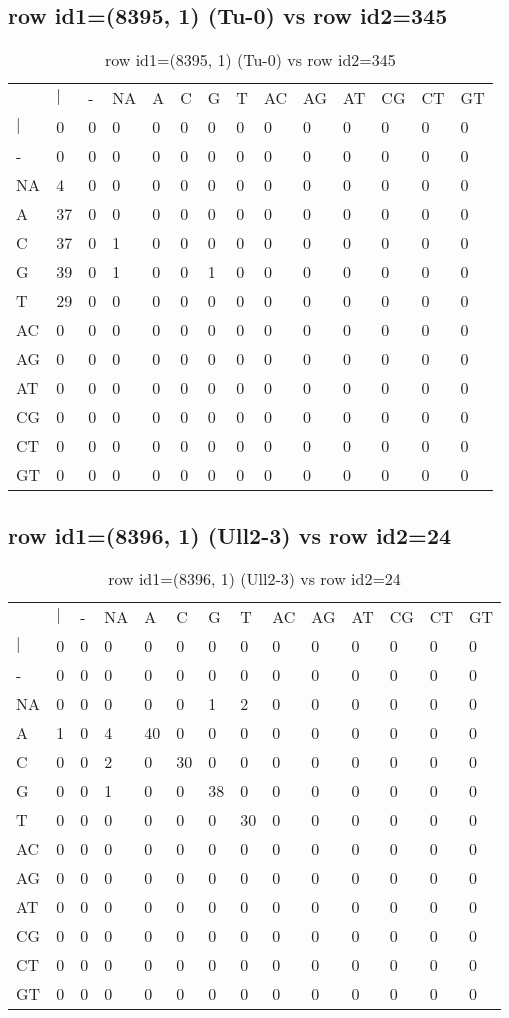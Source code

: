 \subsection{row id1=(8395, 1) (Tu-0) vs row id2=345}
\begin{center}
\begin{longtable}{|l|l|l|l|l|l|l|l|l|l|l|l|l|l|}
\caption{row id1=(8395, 1) (Tu-0) vs row id2=345} \label{table_dm646}\\
\hline
\\
\hline
&$|$&-&NA&A&C&G&T&AC&AG&AT&CG&CT&GT\\
$|$&0&0&0&0&0&0&0&0&0&0&0&0&0\\
-&0&0&0&0&0&0&0&0&0&0&0&0&0\\
NA&4&0&0&0&0&0&0&0&0&0&0&0&0\\
A&37&0&0&0&0&0&0&0&0&0&0&0&0\\
C&37&0&1&0&0&0&0&0&0&0&0&0&0\\
G&39&0&1&0&0&1&0&0&0&0&0&0&0\\
T&29&0&0&0&0&0&0&0&0&0&0&0&0\\
AC&0&0&0&0&0&0&0&0&0&0&0&0&0\\
AG&0&0&0&0&0&0&0&0&0&0&0&0&0\\
AT&0&0&0&0&0&0&0&0&0&0&0&0&0\\
CG&0&0&0&0&0&0&0&0&0&0&0&0&0\\
CT&0&0&0&0&0&0&0&0&0&0&0&0&0\\
GT&0&0&0&0&0&0&0&0&0&0&0&0&0\\
\hline
\end{longtable}
\end{center}

\subsection{row id1=(8396, 1) (Ull2-3) vs row id2=24}
\begin{center}
\begin{longtable}{|l|l|l|l|l|l|l|l|l|l|l|l|l|l|}
\caption{row id1=(8396, 1) (Ull2-3) vs row id2=24} \label{table_dm648}\\
\hline
\\
\hline
&$|$&-&NA&A&C&G&T&AC&AG&AT&CG&CT&GT\\
$|$&0&0&0&0&0&0&0&0&0&0&0&0&0\\
-&0&0&0&0&0&0&0&0&0&0&0&0&0\\
NA&0&0&0&0&0&1&2&0&0&0&0&0&0\\
A&1&0&4&40&0&0&0&0&0&0&0&0&0\\
C&0&0&2&0&30&0&0&0&0&0&0&0&0\\
G&0&0&1&0&0&38&0&0&0&0&0&0&0\\
T&0&0&0&0&0&0&30&0&0&0&0&0&0\\
AC&0&0&0&0&0&0&0&0&0&0&0&0&0\\
AG&0&0&0&0&0&0&0&0&0&0&0&0&0\\
AT&0&0&0&0&0&0&0&0&0&0&0&0&0\\
CG&0&0&0&0&0&0&0&0&0&0&0&0&0\\
CT&0&0&0&0&0&0&0&0&0&0&0&0&0\\
GT&0&0&0&0&0&0&0&0&0&0&0&0&0\\
\hline
\end{longtable}
\end{center}

